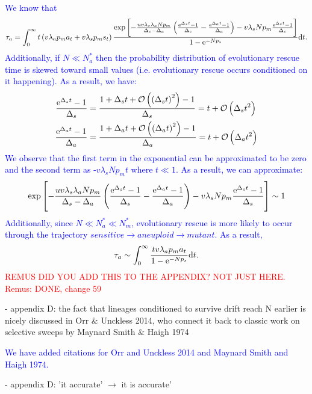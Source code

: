 \documentclass[12pt]{extarticle}
\renewcommand{\d}{{\rm d}}
\newcommand{\e}{{\rm e}}
\begin{document}
\textcolor{blue}{We know that
\begin{align*}
\tau_a=\int_0^\infty t\left(v\lambda_ap_ma_t+v\lambda_sp_ms_t\right)\frac{\exp\left[-\frac{uv\lambda_s\lambda_aNp_m}{\Delta_s-\Delta_a}\left(\frac{\e^{\Delta_s t}-1}{\Delta_s}-\frac{\e^{\Delta_a t}-1}{\Delta_a}\right)-v\lambda_sNp_m\frac{\e^{\Delta_s t}-1}{\Delta_s}\right] }{1-\e^{-Np_s}}\d t.
\end{align*}
Additionally, if $N\ll N_a^*$ then the probability distribution of evolutionary rescue time is skewed toward small values (i.e. evolutionary rescue occurs conditioned on it happening). As a result, we have: 
\begin{align*}
\frac{\e^{\Delta_s t}-1}{\Delta_s}&=\frac{1+\Delta_s t+\mathcal{O}\left(\left(\Delta_st\right)^2\right)-1}{\Delta_s}=t+\mathcal{O}\left(\Delta_st^2\right)\\
\frac{\e^{\Delta_a t}-1}{\Delta_a}&=\frac{1+\Delta_a t+\mathcal{O}\left(\left(\Delta_at\right)^2\right)-1}{\Delta_a}=t+\mathcal{O}\left(\Delta_at^2\right)
\end{align*}
We observe that the first term in the exponential can be approximated to be zero and the second term as -$v\lambda_sNp_mt$ where $t\ll1$. As a result, we can approximate:
\begin{equation*}
\exp\left[-\frac{uv\lambda_s\lambda_aNp_m}{\Delta_s-\Delta_a}\left(\frac{\e^{\Delta_s t}-1}{\Delta_s}-\frac{\e^{\Delta_a t}-1}{\Delta_a}\right)-v\lambda_sNp_m\frac{\e^{\Delta_s t}-1}{\Delta_s}\right] \sim 1
\end{equation*}
Additionally, since $N\ll N_a^*\ll N_m^*$, evolutionary rescue is more likely to occur through the trajectory $sensitive \rightarrow aneuploid \rightarrow mutant$. As a result,
\begin{equation*}
\tau_a\sim\int_0^\infty \frac{tv\lambda_ap_ma_t}{1-\e^{-Np_s}}\d t.
\end{equation*}
}
\textcolor{red}{REMUS DID YOU ADD THIS TO THE APPENDIX? NOT JUST HERE. Remus: DONE, change 59}

- appendix D: the fact that lineages conditioned to survive drift reach N earlier is nicely discussed in Orr $\&$ Unckless 2014, who connect it back to classic work on selective sweeps by Maynard Smith $\&$ Haigh 1974

\textcolor{blue}{We have added citations for Orr and Unckless 2014 and Maynard Smith and Haigh 1974. } %

- appendix D: 'it accurate' $\rightarrow$ it is accurate'
\end{document}
